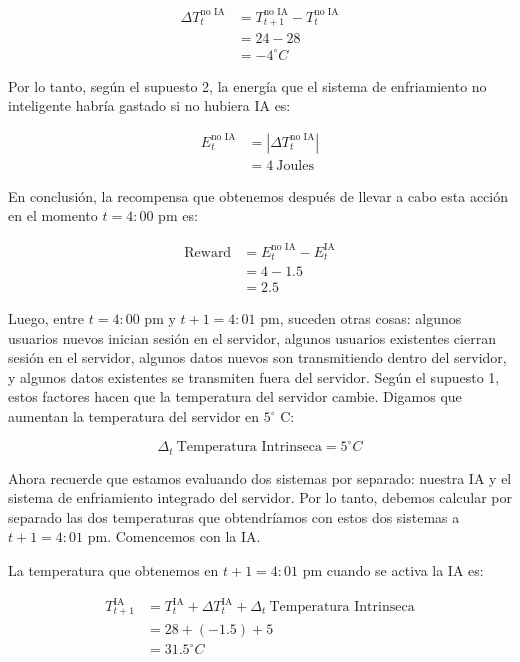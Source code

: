 \documentclass[]{book}
\begin{document}
\begin{align*}
    \Delta T_t^{\textrm{no IA}}
    & = T_{t+1}^{\textrm{no IA}} - T_t^{\textrm{no IA}} \\
    & = 24 - 28 \\
    & = -4^{\circ} C
\end{align*}

Por lo tanto, según el supuesto 2, la energía que el sistema de enfriamiento no inteligente habría gastado si no hubiera IA es:

\begin{align*}
    E_t^{\textrm{no IA}}
    & = |\Delta T_t^{\textrm{no IA}}| \\
    & = 4 \ \textrm{Joules}
\end{align*}

En conclusión, la recompensa que obtenemos después de llevar a cabo esta acción en el momento \(t = 4: 00\) pm es:

\begin{align*}
    \textrm{Reward}
    & = E_t^{\textrm{no IA}} - E_t^{\textrm{IA}} \\
    & = 4 - 1.5 \\
    & = 2.5
\end{align*}

Luego, entre \(t = 4: 00\) pm y \(t + 1 = 4: 01\) pm, suceden otras cosas: algunos usuarios nuevos inician sesión en el servidor, algunos usuarios existentes cierran sesión en el servidor, algunos datos nuevos son transmitiendo dentro del servidor, y algunos datos existentes se transmiten fuera del servidor. Según el supuesto 1, estos factores hacen que la temperatura del servidor cambie. Digamos que aumentan la temperatura del servidor en \(5^{\circ}\) C:

\[\Delta_t \ \textrm{Temperatura Intrinseca} = 5^{\circ} C\]

Ahora recuerde que estamos evaluando dos sistemas por separado: nuestra IA y el sistema de enfriamiento integrado del servidor. Por lo tanto, debemos calcular por separado las dos temperaturas que obtendríamos con estos dos sistemas a \(t + 1 = 4: 01\) pm. Comencemos con la IA.

La temperatura que obtenemos en \(t + 1 = 4: 01\) pm cuando se activa la IA es:

\begin{align*}
    T_{t+1}^{\textrm{IA}}
    & = T_t^{\textrm{IA}} + \Delta T_t^{\textrm{IA}} + \Delta_t \ \textrm{Temperatura Intrinseca} \\
    & = 28 + (-1.5) + 5 \\
    & = 31.5^{\circ} C
\end{align*}
\end{document}
